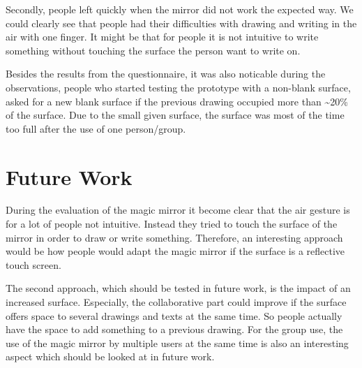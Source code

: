 \documentclass{sigchi-ext}
\begin{document}
Secondly, people left quickly when the mirror did not work the expected way. We could clearly see that people had their difficulties with drawing and writing in the air with one finger. It might be that for people it is not intuitive to write something without touching the surface the person want to write on.

Besides the results from the questionnaire, it was also noticable during the observations, people who started testing the prototype with a non-blank surface, asked for a new blank surface if the previous drawing occupied more than \textasciitilde20\% of the surface. Due to the small given surface, the surface was most of the time too full after the use of one person/group.

\section{Future Work}
During the evaluation of the magic mirror it become clear that the air gesture is for a lot of people not intuitive. Instead they tried to touch the surface of the mirror in order to draw or write something. Therefore, an interesting approach would be how people would adapt the magic mirror if the surface is a reflective touch screen.

The second approach, which should be tested in future work, is the impact of an increased surface. Especially, the collaborative part could improve if the surface offers space to several drawings and texts at the same time. So people actually have the space to add something to a previous drawing. For the group use, the use of the magic mirror by multiple users at the same time is also an interesting aspect which should be looked at in future work.


\balance{} 



\end{document}
